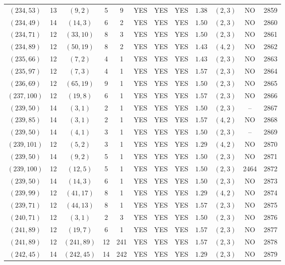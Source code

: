 \begin{longtable}{|c|c|c|c|c|c|c|c|c|c|c|c|}
$(234,53)$ & 13 & $(9,2)$ & 5 & 9 & YES & YES & YES & $1.38$ & $(2,3)$ & NO & 2859\\
$(234,49)$ & 14 & $(14,3)$ & 6 & 2 & YES & YES & YES & $1.50$ & $(2,3)$ & NO & 2860\\
$(234,71)$ & 12 & $(33,10)$ & 8 & 3 & YES & YES & YES & $1.50$ & $(2,3)$ & NO & 2861\\
$(234,89)$ & 12 & $(50,19)$ & 8 & 2 & YES & YES & YES & $1.43$ & $(4,2)$ & NO & 2862\\
$(235,66)$ & 12 & $(7,2)$ & 4 & 1 & YES & YES & YES & $1.43$ & $(2,3)$ & NO & 2863\\
$(235,97)$ & 12 & $(7,3)$ & 4 & 1 & YES & YES & YES & $1.57$ & $(2,3)$ & NO & 2864\\
$(236,69)$ & 12 & $(65,19)$ & 9 & 1 & YES & YES & YES & $1.50$ & $(2,3)$ & NO & 2865\\
$(237,100)$ & 12 & $(19,8)$ & 6 & 1 & YES & YES & YES & $1.57$ & $(2,3)$ & NO & 2866\\
$(239,50)$ & 14 & $(3,1)$ & 2 & 1 & YES & YES & YES & $1.50$ & $(2,3)$ & -- & 2867\\
$(239,85)$ & 14 & $(3,1)$ & 2 & 1 & YES & YES & YES & $1.57$ & $(4,2)$ & NO & 2868\\
$(239,50)$ & 14 & $(4,1)$ & 3 & 1 & YES & YES & YES & $1.50$ & $(2,3)$ & -- & 2869\\
$(239,101)$ & 12 & $(5,2)$ & 3 & 1 & YES & YES & YES & $1.29$ & $(4,2)$ & NO & 2870\\
$(239,50)$ & 14 & $(9,2)$ & 5 & 1 & YES & YES & YES & $1.50$ & $(2,3)$ & NO & 2871\\
$(239,100)$ & 12 & $(12,5)$ & 5 & 1 & YES & YES & YES & $1.50$ & $(2,3)$ & 2464 & 2872\\
$(239,50)$ & 14 & $(14,3)$ & 6 & 1 & YES & YES & YES & $1.50$ & $(2,3)$ & NO & 2873\\
$(239,99)$ & 12 & $(41,17)$ & 8 & 1 & YES & YES & YES & $1.29$ & $(4,2)$ & NO & 2874\\
$(239,71)$ & 12 & $(44,13)$ & 8 & 1 & YES & YES & YES & $1.57$ & $(2,3)$ & NO & 2875\\
$(240,71)$ & 12 & $(3,1)$ & 2 & 3 & YES & YES & YES & $1.50$ & $(2,3)$ & NO & 2876\\
$(241,89)$ & 12 & $(19,7)$ & 6 & 1 & YES & YES & YES & $1.57$ & $(2,3)$ & NO & 2877\\
$(241,89)$ & 12 & $(241,89)$ & 12 & 241 & YES & YES & YES & $1.57$ & $(2,3)$ & NO & 2878\\
$(242,45)$ & 14 & $(242,45)$ & 14 & 242 & YES & YES & YES & $1.29$ & $(2,3)$ & NO & 2879\\

\end{longtable}
